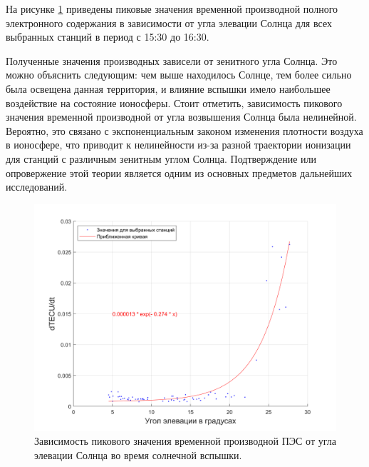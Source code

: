 \documentclass[a4paper]{article}
\begin{document}
\clearpage
\newpage

На рисунке \ref{dtecsun} приведены пиковые значения временной производной полного электронного содержания в зависимости от угла элевации Солнца для всех выбранных станций в период с 15:30 до 16:30.

Полученные значения производных зависели от зенитного угла Солнца. Это можно объяснить следующим: чем выше находилось Солнце, тем более сильно была освещена данная территория, и влияние вспышки имело наибольшее воздействие на состояние ионосферы. Стоит отметить, зависимость пикового значения временной производной от угла возвышения Солнца была нелинейной. 
Вероятно, это связано с экспоненциальным законом изменения плотности воздуха в ионосфере, что приводит к нелинейности из-за разной траектории ионизации для станций с различным зенитным углом Солнца. Подтверждение или опровержение этой теории является одним из основных предметов дальнейших исследований. 

\begin{figure}[h!]
\centering
\includegraphics[width = 0.9\linewidth]{pics/clean_pics/dtec_elev.png}
\caption{Зависимость пикового значения временной производной ПЭС от угла элевации Солнца во время солнечной вспышки.}
\label{dtecsun}
\end{figure}

\end{document}
